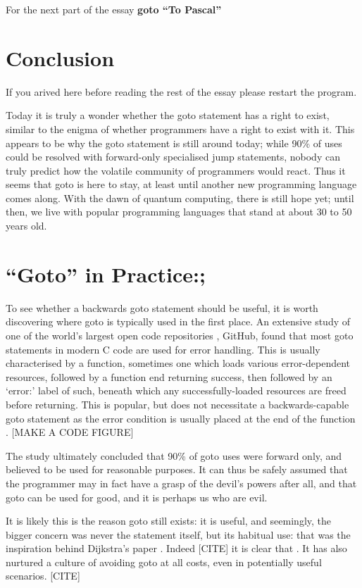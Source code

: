 \documentclass{journal}
\begin{document}
For the next part of the essay \textbf{goto ``To Pascal''}

\section{Conclusion}
If you arived here before reading the rest of the essay please restart the program.

Today it is truly a wonder whether the goto statement has a right to exist, similar to the enigma of whether programmers have a right to exist with it. This appears to be why the goto statement is still around today; while 90\% of uses could be resolved with forward-only specialised jump statements, nobody can truly predict how the volatile community of programmers would react. Thus it seems that goto is here to stay, at least until another new programming language comes along. With the dawn of quantum computing, there is still hope yet; until then, we live with popular programming languages that stand at about 30 to 50 years old.

\section{``Goto'' in Practice:;}
To see whether a backwards goto statement should be useful, it is worth discovering where goto is typically used in the first place. An extensive study \cite{gotostudy} of one of the world's largest open code repositories \cite{github}, GitHub, found that most goto statements in modern C code are used for error handling. This is usually characterised by a function, sometimes one which loads various error-dependent resources, followed by a function end returning success, then followed by an `error:' label of such, beneath which any successfully-loaded resources are freed before returning. This is popular, but does not necessitate a backwards-capable goto statement as the error condition is usually placed at the end of the function \cite{gotostudy}. [MAKE A CODE FIGURE]

The study ultimately concluded that 90\% of goto uses were forward only, and believed to be used for reasonable purposes. It can thus be safely assumed that the programmer may in fact have a grasp of the devil's powers after all, and that goto can be used for good, and it is perhaps us who are evil.

It is likely this is the reason goto still exists: it is useful, and seemingly, the bigger concern was never the statement itself, but its habitual use: that was the inspiration behind Dijkstra's paper \cite{goto}. Indeed [CITE] it is clear that . It has also nurtured a culture of avoiding goto at all costs, even in potentially useful scenarios. [CITE]
\end{document}
